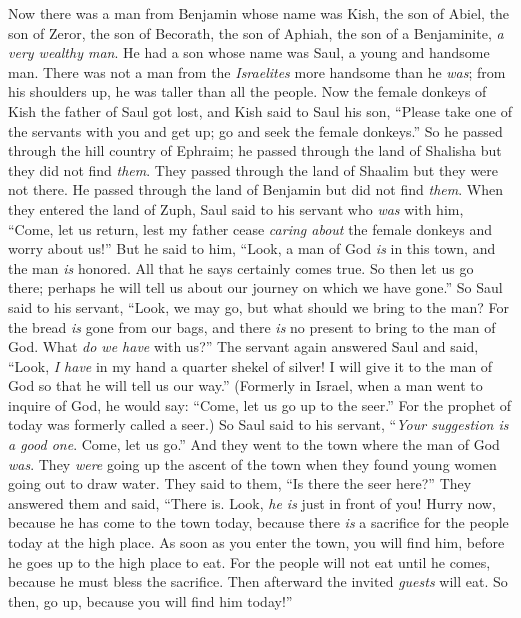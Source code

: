 \begin{biblechapter} %
 Now there was a man from Benjamin whose name was Kish, the son of Abiel, the son of Zeror, the son of Becorath, the son of Aphiah, the son of a Benjaminite, \textit{a very wealthy man}.
\verse He had a son whose name was Saul, a young and handsome man. There was not a man from the \textit{Israelites} more handsome than he \textit{was}; from his shoulders up, he was taller than all the people.
\verse Now the female donkeys of Kish the father of Saul got lost, and Kish said to Saul his son, “Please take one of the servants with you and get up; go and seek the female donkeys.”
\verse So he passed through the hill country of Ephraim; he passed through the land of Shalisha but they did not find \textit{them}. They passed through the land of Shaalim but they were not there. He passed through the land of Benjamin but did not find \textit{them}.
\verse When they entered the land of Zuph, Saul said to his servant who \textit{was} with him, “Come, let us return, lest my father cease \textit{caring about} the female donkeys and worry about us!”
\verse But he said to him, “Look, a man of God \textit{is} in this town, and the man \textit{is} honored. All that he says certainly comes true. So then let us go there; perhaps he will tell us about our journey on which we have gone.”
\verse So Saul said to his servant, “Look, we may go, but what should we bring to the man? For the bread \textit{is} gone from our bags, and there \textit{is} no present to bring to the man of God. What \textit{do we have} with us?”
\verse The servant again answered Saul and said, “Look, \textit{I have} in my hand a quarter shekel of silver! I will give it to the man of God so that he will tell us our way.”
\verse (Formerly in Israel, when a man went to inquire of God, he would say: “Come, let us go up to the seer.” For the prophet of today was formerly called a seer.)
\verse So Saul said to his servant, “\textit{Your suggestion is a good one}. Come, let us go.” And they went to the town where the man of God \textit{was}.
\verse They \textit{were} going up the ascent of the town when they found young women going out to draw water. They said to them, “Is there the seer here?”
\verse They answered them and said, “There is. Look, \textit{he is} just in front of you! Hurry now, because he has come to the town today, because there \textit{is} a sacrifice for the people today at the high place.
\verse As soon as you enter the town, you will find him, before he goes up to the high place to eat. For the people will not eat until he comes, because he must bless the sacrifice. Then afterward the invited \textit{guests} will eat. So then, go up, because you will find him today!”

\end{biblechapter}
